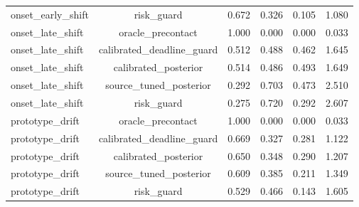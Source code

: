 \begin{table}[t]
\begin{tabular}{lccccc}
onset\_early\_shift & risk\_guard & 0.672 & 0.326 & 0.105 & 1.080 \\
onset\_late\_shift & oracle\_precontact & 1.000 & 0.000 & 0.000 & 0.033 \\
onset\_late\_shift & calibrated\_deadline\_guard & 0.512 & 0.488 & 0.462 & 1.645 \\
onset\_late\_shift & calibrated\_posterior & 0.514 & 0.486 & 0.493 & 1.649 \\
onset\_late\_shift & source\_tuned\_posterior & 0.292 & 0.703 & 0.473 & 2.510 \\
onset\_late\_shift & risk\_guard & 0.275 & 0.720 & 0.292 & 2.607 \\
prototype\_drift & oracle\_precontact & 1.000 & 0.000 & 0.000 & 0.033 \\
prototype\_drift & calibrated\_deadline\_guard & 0.669 & 0.327 & 0.281 & 1.122 \\
prototype\_drift & calibrated\_posterior & 0.650 & 0.348 & 0.290 & 1.207 \\
prototype\_drift & source\_tuned\_posterior & 0.609 & 0.385 & 0.211 & 1.349 \\
prototype\_drift & risk\_guard & 0.529 & 0.466 & 0.143 & 1.605 \\
\bottomrule
\end{tabular}
\end{table}
